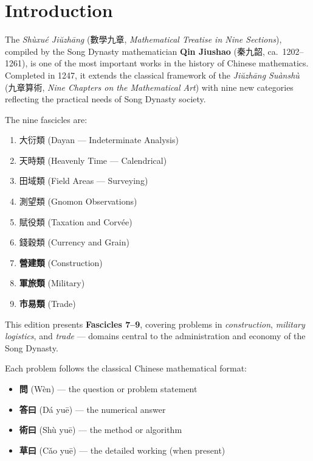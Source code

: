\documentclass[11pt,a4paper]{article}
\begin{document}
\tableofcontents
\newpage

\section{Introduction}

The \textit{Sh\`uxu\'e Ji\u{u}zh\=ang} (數學九章, \textit{Mathematical Treatise in Nine Sections}), compiled by the Song Dynasty mathematician \textbf{Qin Jiushao} (秦九韶, ca.~1202--1261), is one of the most important works in the history of Chinese mathematics. Completed in 1247, it extends the classical framework of the \textit{Ji\u{u}zh\=ang Su\`ansh\`u} (九章算術, \textit{Nine Chapters on the Mathematical Art}) with nine new categories reflecting the practical needs of Song Dynasty society.

The nine fascicles are:
\begin{enumerate}
  \item 大衍類 (Dayan --- Indeterminate Analysis)
  \item 天時類 (Heavenly Time --- Calendrical)
  \item 田域類 (Field Areas --- Surveying)
  \item 測望類 (Gnomon Observations)
  \item 賦役類 (Taxation and Corv\'ee)
  \item 錢穀類 (Currency and Grain)
  \item \textbf{營建類} (Construction)
  \item \textbf{軍旅類} (Military)
  \item \textbf{市易類} (Trade)
\end{enumerate}

\medskip
\noindent This edition presents \textbf{Fascicles 7--9}, covering problems in \textit{construction}, \textit{military logistics}, and \textit{trade} --- domains central to the administration and economy of the Song Dynasty.

\medskip
\noindent Each problem follows the classical Chinese mathematical format:
\begin{itemize}
  \item \textbf{問} (W\`en) --- the question or problem statement
  \item \textbf{答曰} (D\'a yu\=e) --- the numerical answer
  \item \textbf{術曰} (Sh\`u yu\=e) --- the method or algorithm
  \item \textbf{草曰} (C\v{a}o yu\=e) --- the detailed working (when present)
\end{itemize}
\end{document}
